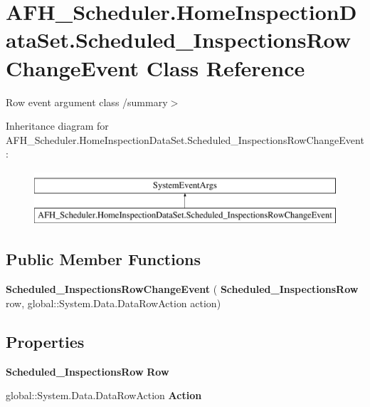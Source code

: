 \section{A\+F\+H\+\_\+\+Scheduler.\+Home\+Inspection\+Data\+Set.\+Scheduled\+\_\+\+Inspections\+Row\+Change\+Event Class Reference}
\label{class_a_f_h___scheduler_1_1_home_inspection_data_set_1_1_scheduled___inspections_row_change_event}


Row event argument class /summary$>$  


Inheritance diagram for A\+F\+H\+\_\+\+Scheduler.\+Home\+Inspection\+Data\+Set.\+Scheduled\+\_\+\+Inspections\+Row\+Change\+Event\+:\begin{figure}[H]
\begin{center}
\leavevmode
\includegraphics[height=2.000000cm]{class_a_f_h___scheduler_1_1_home_inspection_data_set_1_1_scheduled___inspections_row_change_event}
\end{center}
\end{figure}
\subsection*{Public Member Functions}
\begin{DoxyCompactItemize}
\item 
\mbox{\label{class_a_f_h___scheduler_1_1_home_inspection_data_set_1_1_scheduled___inspections_row_change_event_a17ad9626ff6c14e183673ff541661fed}} 
{\bfseries Scheduled\+\_\+\+Inspections\+Row\+Change\+Event} (\textbf{ Scheduled\+\_\+\+Inspections\+Row} row, global\+::\+System.\+Data.\+Data\+Row\+Action action)
\end{DoxyCompactItemize}
\subsection*{Properties}
\begin{DoxyCompactItemize}
\item 
\mbox{\label{class_a_f_h___scheduler_1_1_home_inspection_data_set_1_1_scheduled___inspections_row_change_event_a260ed4f79158fee5f79fc103851a5ce8}} 
\textbf{ Scheduled\+\_\+\+Inspections\+Row} {\bfseries Row}\hspace{0.3cm}{\ttfamily  [get]}
\item 
\mbox{\label{class_a_f_h___scheduler_1_1_home_inspection_data_set_1_1_scheduled___inspections_row_change_event_a72b7a0e06df48389b1faf5efd258aa43}} 
global\+::\+System.\+Data.\+Data\+Row\+Action {\bfseries Action}\hspace{0.3cm}{\ttfamily  [get]}
\end{DoxyCompactItemize}


